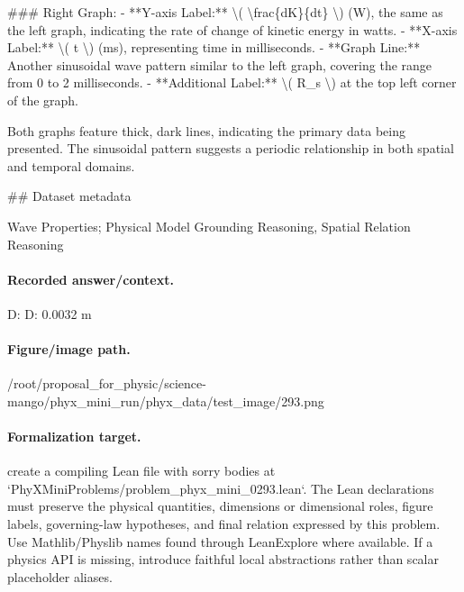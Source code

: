 \#\#\# Right Graph:
- **Y-axis Label:** \textbackslash{}( \textbackslash{}frac\{dK\}\{dt\} \textbackslash{}) (W), the same as the left graph, indicating the rate of change of kinetic energy in watts.
- **X-axis Label:** \textbackslash{}( t \textbackslash{}) (ms), representing time in milliseconds.
- **Graph Line:** Another sinusoidal wave pattern similar to the left graph, covering the range from 0 to 2 milliseconds.
- **Additional Label:** \textbackslash{}( R\_s \textbackslash{}) at the top left corner of the graph.

Both graphs feature thick, dark lines, indicating the primary data being presented. The sinusoidal pattern suggests a periodic relationship in both spatial and temporal domains.

\#\# Dataset metadata

Wave Properties; Physical Model Grounding Reasoning, Spatial Relation Reasoning

\paragraph{Recorded answer/context.}
D: D: 0.0032 m

\paragraph{Figure/image path.}
/root/proposal\_for\_physic/science-mango/phyx\_mini\_run/phyx\_data/test\_image/293.png

\paragraph{Formalization target.}
create a compiling Lean file with sorry bodies at `PhyXMiniProblems/problem\_phyx\_mini\_0293.lean`. The Lean declarations must preserve the physical quantities, dimensions or dimensional roles, figure labels, governing-law hypotheses, and final relation expressed by this problem.
Use Mathlib/Physlib names found through LeanExplore where available. If a physics API is missing, introduce faithful local abstractions rather than scalar placeholder aliases.

